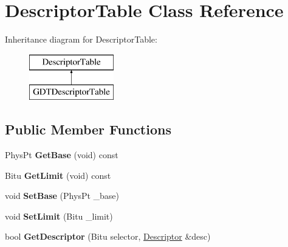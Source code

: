 \hypertarget{classDescriptorTable}{\section{Descriptor\-Table Class Reference}
\label{classDescriptorTable}
}
Inheritance diagram for Descriptor\-Table\-:\begin{figure}[H]
\begin{center}
\leavevmode
\includegraphics[height=2.000000cm]{classDescriptorTable}
\end{center}
\end{figure}
\subsection*{Public Member Functions}
\begin{DoxyCompactItemize}
\item 
\hypertarget{classDescriptorTable_ae907889e12488e2a5d3e05cb773f521f}{Phys\-Pt {\bfseries Get\-Base} (void) const }\label{classDescriptorTable_ae907889e12488e2a5d3e05cb773f521f}

\item 
\hypertarget{classDescriptorTable_ac6d5e2e303f54d35204cd719a6293e3b}{Bitu {\bfseries Get\-Limit} (void) const }\label{classDescriptorTable_ac6d5e2e303f54d35204cd719a6293e3b}

\item 
\hypertarget{classDescriptorTable_a615d69b99e491d50023e9feca950583f}{void {\bfseries Set\-Base} (Phys\-Pt \-\_\-base)}\label{classDescriptorTable_a615d69b99e491d50023e9feca950583f}

\item 
\hypertarget{classDescriptorTable_a537ad64528d292f9c7c791d8a754da35}{void {\bfseries Set\-Limit} (Bitu \-\_\-limit)}\label{classDescriptorTable_a537ad64528d292f9c7c791d8a754da35}

\item 
\hypertarget{classDescriptorTable_a5b7215649b48adf865cb4ca21c5e2a1d}{bool {\bfseries Get\-Descriptor} (Bitu selector, \hyperlink{classDescriptor}{Descriptor} \&desc)}\label{classDescriptorTable_a5b7215649b48adf865cb4ca21c5e2a1d}

\end{DoxyCompactItemize}
